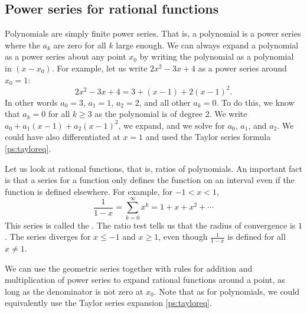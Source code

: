 \subsection{Power series for rational functions}

Polynomials are simply finite power series.  That is, a polynomial
is a power series where
the $a_k$ are zero for all $k$ large enough.  We can always expand
a polynomial as a power series about any point $x_0$ by writing
the polynomial as a polynomial in $(x-x_0)$.  For example,
let us write
$2x^2-3x+4$ as a power series around $x_0 = 1$:
\begin{equation*}
2x^2-3x+4 = 3 + (x-1) + 2{(x-1)}^2 .
\end{equation*}
In other words $a_0 = 3$, $a_1 = 1$, $a_2 = 2$, and all other
$a_k = 0$.  To do this, we know that $a_k = 0$ for all $k \geq 3$ as the
polynomial is of degree 2.
We write $a_0 + a_1(x-1) + a_2{(x-1)}^2$, we expand, and we solve
for $a_0$, $a_1$, and $a_2$.  We could have also differentiated at $x=1$
and used the Taylor series formula \eqref{ps:tayloreq}.

Let us look at rational functions, that is, ratios of polynomials.
An important fact is 
that a series for a function only defines the function
on an interval even if the function is defined elsewhere.  For example, for
$-1 < x < 1$,
\begin{equation*}
\frac{1}{1-x} =
\sum_{k=0}^\infty x^k =
1 + x + x^2 + \cdots
\end{equation*}
This series is called the \emph{}.  The ratio
test tells us that the radius of convergence is $1$.  The series
diverges for $x \leq -1$ and $x \geq 1$, even though
$\frac{1}{1-x}$ is defined for all $x \not= 1$.

We can use the geometric series together with rules for addition and
multiplication of power series to expand rational functions around
a point, as long as the denominator is not zero at $x_0$.  Note that
as for polynomials, we could
equivalently use the Taylor series expansion \eqref{ps:tayloreq}.

